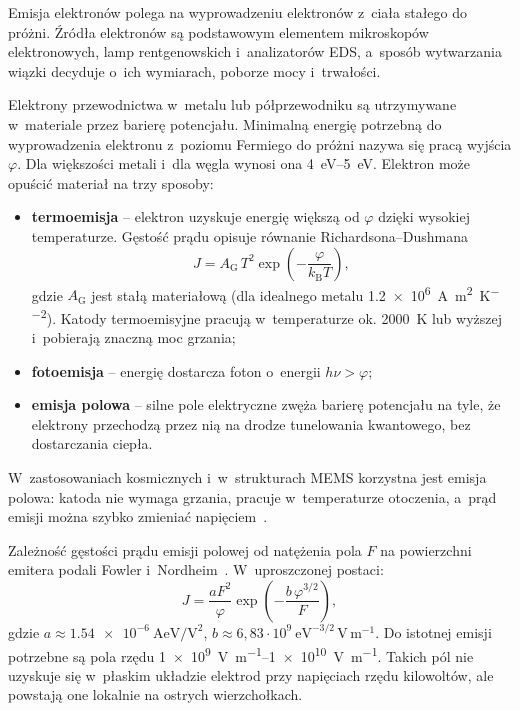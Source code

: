 \begin{zmiana}
Emisja elektronów polega na wyprowadzeniu elektronów z~ciała stałego do
próżni. Źródła elektronów są podstawowym elementem mikroskopów
elektronowych, lamp rentgenowskich i~analizatorów EDS, a~sposób
wytwarzania wiązki decyduje o~ich wymiarach, poborze mocy i~trwałości.
\end{zmiana}
Elektrony przewodnictwa w~metalu lub półprzewodniku są utrzymywane
w~materiale przez barierę potencjału. Minimalną energię potrzebną do
wyprowadzenia elektronu z~poziomu Fermiego do próżni nazywa się pracą
wyjścia $\varphi$. Dla większości metali i~dla węgla wynosi ona
\SIrange{4}{5}{\electronvolt}. Elektron może opuścić materiał na trzy
sposoby:
\begin{itemize}
  \item \textbf{termoemisja} -- elektron uzyskuje energię większą od
        $\varphi$ dzięki wysokiej temperaturze. Gęstość prądu opisuje
        równanie Richardsona--Dushmana
        \begin{equation}
          J = A_\mathrm{G}\,T^2 \exp\!\left(-\frac{\varphi}{k_\mathrm{B}T}\right),
        \end{equation}
        gdzie $A_\mathrm{G}$ jest stałą materiałową (dla idealnego metalu
        \SI{1.2e6}{\ampere\per\metre\squared\per\kelvin\squared}).
        Katody termoemisyjne pracują w~temperaturze ok.
        \SI{2000}{\kelvin} lub wyższej i~pobierają znaczną moc
        grzania;
  \item \textbf{fotoemisja} -- energię dostarcza foton o~energii
        $h\nu > \varphi$;
  \item \textbf{emisja polowa} -- silne pole elektryczne zwęża barierę
        potencjału na tyle, że elektrony przechodzą przez nią na drodze
        tunelowania kwantowego, bez dostarczania ciepła.
\end{itemize}

W~zastosowaniach kosmicznych i~w~strukturach MEMS korzystna jest emisja
polowa: katoda nie wymaga grzania, pracuje w~temperaturze otoczenia,
a~prąd emisji można szybko zmieniać napięciem~\cite{parmee2015cntxray}.

Zależność gęstości prądu emisji polowej od natężenia pola $F$ na
powierzchni emitera podali Fowler i~Nordheim~\cite{fowler1928emission}.
W~uproszczonej postaci:
\begin{equation}
  J = \frac{a F^2}{\varphi}\exp\!\left(-\frac{b\,\varphi^{3/2}}{F}\right),
  \label{eq:fn}
\end{equation}
gdzie $a \approx \SI{1.54e-6}{\ampere\electronvolt\per\volt\squared}$,
$b \approx 6{,}83\cdot10^{9}\ \mathrm{eV^{-3/2}\,V\,m^{-1}}$.
Do istotnej emisji potrzebne są pola rzędu
\SIrange{1e9}{1e10}{\volt\per\metre}. Takich pól nie uzyskuje się
w~płaskim układzie elektrod przy napięciach rzędu kilowoltów, ale
powstają one lokalnie na ostrych wierzchołkach.


